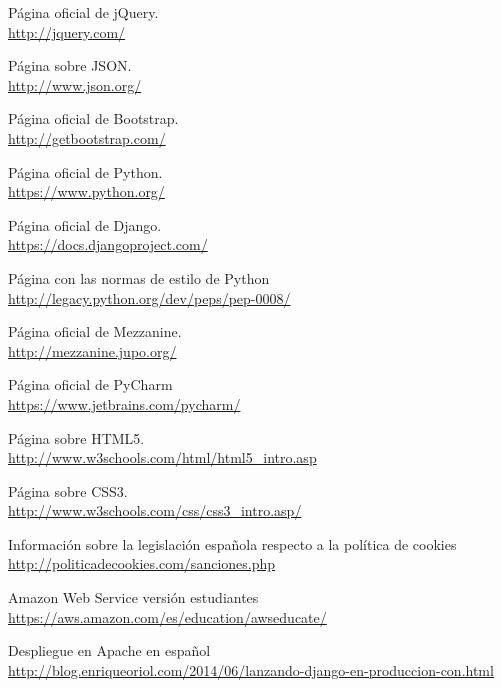 
\cleardoublepage

\begin{thebibliography}{25}


 Página oficial de jQuery.    \\
{\footnotesize \url{http://jquery.com/}}

 Página sobre JSON.    \\
{\footnotesize
\url{http://www.json.org/}}


 Página oficial de Bootstrap.    \\
{\footnotesize
\url{http://getbootstrap.com/}}

 Página oficial de Python.     \\
{\footnotesize
\url{https://www.python.org/}}

 Página oficial de Django.      \\
{\footnotesize
\url{https://docs.djangoproject.com/}}

 Página con las normas de estilo de Python     \\
{\footnotesize
\url{http://legacy.python.org/dev/peps/pep-0008/}}

 Página oficial de Mezzanine.   \\
{\footnotesize
\url{http://mezzanine.jupo.org/}}

 Página oficial de PyCharm    \\
{\footnotesize
\url{https://www.jetbrains.com/pycharm/}}

 Página sobre HTML5.    \\
{\footnotesize
\url{http://www.w3schools.com/html/html5_intro.asp}}



 Página sobre CSS3.    \\
{\footnotesize
\url{http://www.w3schools.com/css/css3_intro.asp/ }}

 Información sobre la legislación española respecto a la política de cookies      \\
{\footnotesize
\url{http://politicadecookies.com/sanciones.php}}

Amazon Web Service versión estudiantes  \\
{\footnotesize
\url{https://aws.amazon.com/es/education/awseducate/ }}

Despliegue en Apache en español  \\
{\footnotesize
\url{http://blog.enriqueoriol.com/2014/06/lanzando-django-en-produccion-con.html}}


\end{thebibliography}
